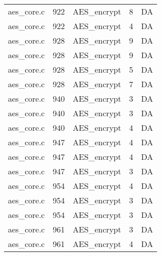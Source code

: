\begin{table}[h!]
\begin{tabular}{lrlrr}
aes\_core.c& 922&AES\_encrypt&8 &DA\\
aes\_core.c& 922&AES\_encrypt&4 &DA\\
aes\_core.c& 928&AES\_encrypt&9 &DA\\
aes\_core.c& 928&AES\_encrypt&9 &DA\\
aes\_core.c& 928&AES\_encrypt&5 &DA\\
aes\_core.c& 928&AES\_encrypt&7 &DA\\
aes\_core.c& 940&AES\_encrypt&3 &DA\\
aes\_core.c& 940&AES\_encrypt&3 &DA\\
aes\_core.c& 940&AES\_encrypt&4 &DA\\
aes\_core.c& 947&AES\_encrypt&4 &DA\\
aes\_core.c& 947&AES\_encrypt&4 &DA\\
aes\_core.c& 947&AES\_encrypt&3 &DA\\
aes\_core.c& 954&AES\_encrypt&4 &DA\\
aes\_core.c& 954&AES\_encrypt&3 &DA\\
aes\_core.c& 954&AES\_encrypt&3 &DA\\
aes\_core.c& 961&AES\_encrypt&3 &DA\\
aes\_core.c& 961&AES\_encrypt&4 &DA\\
\hline
\end{tabular}
\renewcommand{\baselinestretch}{1.0}\selectfont
\end{table}
